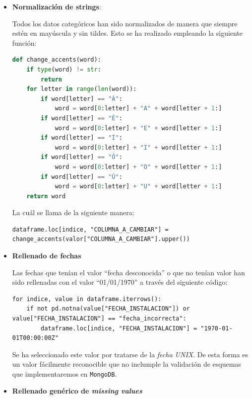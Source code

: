 \documentclass[]{article}
\begin{document}
\begin{itemize}
    \item \textbf{Normalización de strings}:

    Todos los datos categóricos han sido normalizados de manera que siempre estén en mayúscula y sin tildes. Esto se ha realizado empleando la siguiente función:

    \begin{lstlisting}[language=Python]
def change_accents(word):
    if type(word) != str:
        return
    for letter in range(len(word)):
        if word[letter] == "Á":
            word = word[0:letter] + "A" + word[letter + 1:]
        if word[letter] == "É":
            word = word[0:letter] + "E" + word[letter + 1:]
        if word[letter] == "Í":
            word = word[0:letter] + "I" + word[letter + 1:]
        if word[letter] == "Ó":
            word = word[0:letter] + "O" + word[letter + 1:]
        if word[letter] == "Ú":
            word = word[0:letter] + "U" + word[letter + 1:]
    return word
    \end{lstlisting}

    La cuál se llama de la siguiente manera:

    \begin{lstlisting}
dataframe.loc[indice, "COLUMNA_A_CAMBIAR"] = change_accents(valor["COLUMNA_A_CAMBIAR"].upper())
    \end{lstlisting}

    \item \textbf{Rellenado de fechas}

    Las fechas que tenían el valor ``fecha desconocida'' o que no tenían valor han sido rellenadas con el valor ``01/01/1970'' a través del siguiente código:

    \begin{lstlisting}
for indice, value in dataframe.iterrows():
    if not pd.notna(value["FECHA_INSTALACION"]) or value["FECHA_INSTALACION"] == "fecha_incorrecta":
        dataframe.loc[indice, "FECHA_INSTALACION"] = "1970-01-01T00:00:00Z"
    \end{lstlisting}

    Se ha seleccionado este valor por tratarse de la \textit{fecha UNIX}. De
    esta forma es un valor fácilmente reconocible que no inclumple la validación
    de esquemas que implementaremos en \texttt{MongoDB}.

    \item \textbf{Rellenado genérico de \textit{missing values}}
    

\end{itemize}
\end{document}
